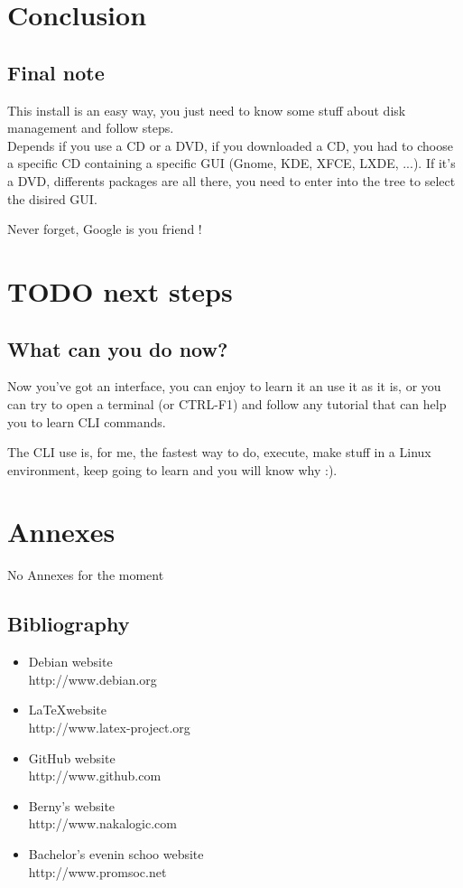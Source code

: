 \documentclass[a4paper,12pt]{book}
\begin{document}
\chapter{Conclusion}
\section{Final note}
This install is an easy way, you just need to know some stuff about disk management and follow steps.\\
Depends if you use a CD or a DVD, if you downloaded a CD, you had to choose a specific CD containing a specific GUI (Gnome, KDE, XFCE, LXDE, ...). If it's a DVD, differents packages are all there, you need to enter into the tree to select the disired GUI.

Never forget, Google is you friend !

\chapter{TODO next steps}
\section{What can you do now?}
Now you've got an interface, you can enjoy to learn it an use it as it is, or you can try to open a terminal (or CTRL-F1) and follow any tutorial that can help you to learn CLI commands.

The CLI use is, for me, the fastest way to do, execute, make stuff in a Linux environment, keep going to learn and you will know why :).

\chapter{Annexes}
No Annexes for the moment

\section{Bibliography}
\begin{itemize}
  	\item Debian website \\ {\color{blue} http://www.debian.org}
  	\item \LaTeX website \\ {\color{blue} http://www.latex-project.org}
  	\item GitHub website \\ {\color{blue} http://www.github.com}
  	\item Berny's website \\ {\color{blue} http://www.nakalogic.com}
  	\item Bachelor's evenin schoo website \\ {\color{blue} http://www.promsoc.net}
\end{itemize}
\end{document}
